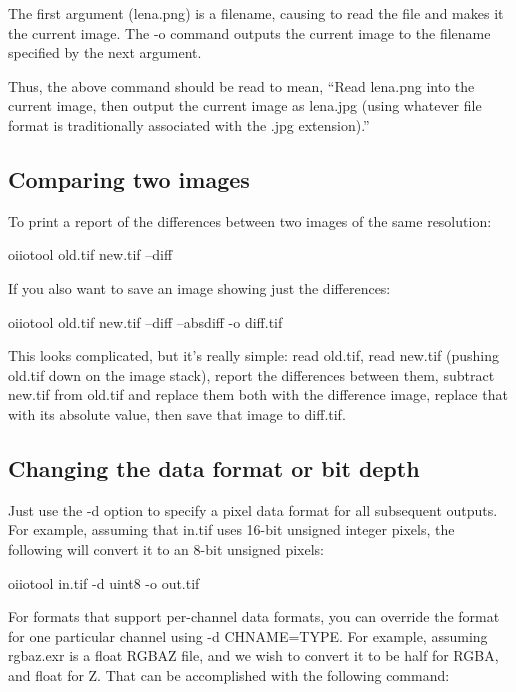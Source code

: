 The first argument ({\cf lena.png}) is a filename, causing \oiiotool to
read the file and makes it the current image.  The {\cf -o} command
outputs the current image to the filename specified by the next
argument.

Thus, the above command should be read to mean, ``Read {\cf lena.png}
into the current image, then output the current image as {\cf lena.jpg}
(using whatever file format is traditionally associated with the {\cf
  .jpg} extension).''


\subsection*{Comparing two images}

To print a report of the differences between two images of the same
resolution:

\begin{code}
    oiiotool old.tif new.tif --diff
\end{code}

\noindent If you also want to save an image showing just the differences:

\begin{code}
    oiiotool old.tif new.tif --diff --absdiff -o diff.tif
\end{code}

This looks complicated, but it's really simple: read {\cf old.tif},
read {\cf new.tif} (pushing {\cf old.tif} down on the image stack),
report the differences between them, subtract {\cf new.tif} from 
{\cf old.tif} and replace them both with the difference image,
replace that with its absolute value, then save that image to 
{\cf diff.tif}.


\subsection*{Changing the data format or bit depth}

Just use the {\cf -d} option to specify a pixel data format for all
subsequent outputs.  For example, assuming that {\cf in.tif} uses 16-bit
unsigned integer pixels, the following will convert it to an 8-bit
unsigned pixels:

\begin{code}
    oiiotool in.tif -d uint8 -o out.tif
\end{code}

For formats that support per-channel data formats, you can override
the format for one particular channel using {\cf -d CHNAME=TYPE}.
For example, assuming {\cf rgbaz.exr} is a {\cf float} RGBAZ file,
and we wish to convert it to be {\cf half} for RGBA, and {\cf float}
for Z.  That can be accomplished with the following command:

